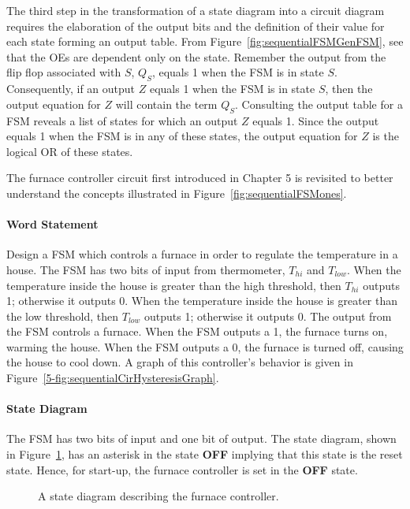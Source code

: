 The third step in the transformation of a state diagram into a circuit
diagram requires the elaboration of the output bits and the definition of their
value for each state forming an output table.  From Figure~\ref{fig:sequentialFSMGenFSM},
see that the OEs are dependent only on the state.  Remember the
output from the flip flop associated with $S$, $Q_S$, equals 1 when the
FSM is in state $S$.  Consequently, if an output $Z$ equals 1 when the
FSM is in state $S$, then the output equation for $Z$ will contain the
term $Q_S$.  Consulting the output table for a FSM reveals a list
of states for which an output $Z$ equals 1.  Since the output equals
1 when the FSM is in any of these states, the output equation for $Z$
is the logical OR of these states.

The furnace controller circuit first introduced in Chapter 5 is
revisited to better understand the concepts illustrated in
Figure~\ref{fig:sequentialFSMones}.


\paragraph{Word Statement}
Design a FSM which controls a furnace in order to regulate the
temperature in a house.  The FSM has two bits of input from thermometer,
$T_{hi}$ and $T_{low}$.  When the temperature inside the house
is greater than the high threshold, then $T_{hi}$ outputs 1; otherwise
it outputs 0.  When the temperature inside the house is greater than
the low threshold, then $T_{low}$ outputs 1; otherwise it outputs 0.
The output from the FSM controls a furnace.  When the FSM outputs a
1, the furnace turns on, warming the house.  When the FSM outputs a 0,
the furnace is turned off, causing the house to cool down.  A graph
of this controller's behavior is given in Figure~\ref{5-fig:sequentialCirHysteresisGraph}.

\paragraph{State Diagram}
The FSM has two bits of input and one bit of
output. The state diagram, shown in Figure~\ref{fig:sequentialFSMFurnaceSD}, has
an asterisk in the state \textbf{ OFF} implying that this state is the reset state.
Hence, for start-up, the furnace controller is set in the \textbf{ OFF}
state.

\begin{figure}[ht]
    \caption{A state diagram describing the furnace controller.}
    \label{fig:sequentialFSMFurnaceSD}
\end{figure}

